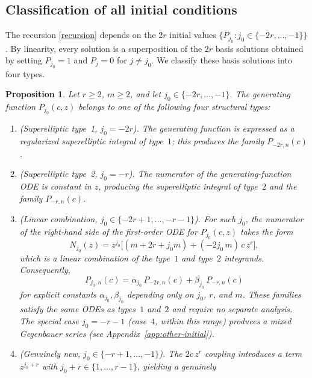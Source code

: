 \documentclass[final,nopreprintline]{elsarticle}
\newtheorem{proposition}[theorem]{Proposition}
\theoremstyle{definition}
\numberwithin{equation}{section}
\theoremstyle{remark}
\begin{document}
\subsection{Classification of all initial conditions}
\label{subsec:classification}

The recursion \eqref{recursion} depends on the $2r$ initial values
$\{P_{j_0} : j_0\in\{-2r,\ldots,-1\}\}$. By linearity, every solution is a superposition
of the $2r$ basis solutions obtained by setting $P_{j_0}=1$ and $P_j=0$ for $j\neq j_0$.
We classify these basis solutions into four types.

\begin{proposition}\label{prop:classification}
Let $r\ge2$, $m\ge2$, and let $j_0\in\{-2r,\ldots,-1\}$. The generating function
$P_{j_0}(c,z)$ belongs to one of the following four structural types:
\begin{enumerate}[\rm(A)]
\item \textup{(Superelliptic type~1, $j_0=-2r$).} The generating function is expressed
    as a regularized superelliptic integral of type~$1$; this produces the family
    $P_{-2r,n}(c)$.
\item[{\rm(A')}] \textup{(Superelliptic type~2, $j_0=-r$).} The numerator of the
    generating-function ODE is constant in $z$, producing the superelliptic integral of
    type~$2$ and the family $P_{-r,n}(c)$.
\item \textup{(Linear combination, $j_0\in\{-2r+1,\ldots,-r-1\}$).} For such $j_0$, the
    numerator of the right-hand side of the first-order ODE for $P_{j_0}(c,z)$ takes the form
    \[
    N_{j_0}(z) = z^{j_0}\bigl[(m+2r+j_0 m) + (-2j_0\,m)\,c\,z^r\bigr],
    \]
    which is a linear combination of the type~$1$ and type~$2$ integrands. Consequently,
    \begin{equation}\label{eq:superposition}
    P_{j_0,n}(c) = \alpha_{j_0}\,P_{-2r,n}(c) + \beta_{j_0}\,P_{-r,n}(c)
    \end{equation}
    for explicit constants $\alpha_{j_0}, \beta_{j_0}$ depending only on $j_0$, $r$, and $m$.
    These families satisfy the same ODEs as types~$1$ and~$2$ and require no separate analysis.
    The special case $j_0=-r-1$ (case~$4$, within this range) produces a mixed Gegenbauer
    series (see Appendix~\ref{app:other-initial}).
\item \textup{(Genuinely new, $j_0\in\{-r+1,\ldots,-1\}$).} The $2c\,z^r$ coupling
    introduces a term $z^{j_0+r}$ with $j_0+r\in\{1,\ldots,r-1\}$, yielding a genuinely

\end{enumerate}
\end{proposition}
\end{document}
